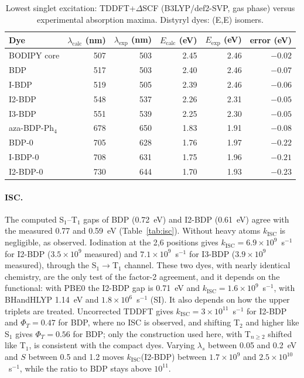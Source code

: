 \documentclass[journal=jctcce,manuscript=article,layout=twocolumn]{achemso}
\newcommand{\kisc}{k_\mathrm{ISC}}
\begin{document}
\begin{table}
  \caption{Lowest singlet excitation: TDDFT+$\Delta$SCF (B3LYP/def2-SVP, gas phase) versus
  experimental absorption maxima. Distyryl dyes: (E,E) isomers.}
  \label{tab:abs}
  \begin{tabular}{lrrrrr}
    \toprule
    Dye & $\lambda_\mathrm{calc}$ (nm) & $\lambda_\mathrm{exp}$ (nm) & $E_\mathrm{calc}$ (eV) &
    $E_\mathrm{exp}$ (eV) & error (eV) \\
    \midrule
    BODIPY core     & 507 & 503 & 2.45 & 2.46 & $-0.02$ \\
    BDP             & 517 & 503 & 2.40 & 2.46 & $-0.07$ \\
    I-BDP           & 519 & 505 & 2.39 & 2.46 & $-0.06$ \\
    I2-BDP          & 548 & 537 & 2.26 & 2.31 & $-0.05$ \\
    I3-BDP          & 551 & 539 & 2.25 & 2.30 & $-0.05$ \\
    aza-BDP-Ph$_4$  & 678 & 650 & 1.83 & 1.91 & $-0.08$ \\
    \midrule
    BDP-0           & 705 & 628 & 1.76 & 1.97 & $-0.22$ \\
    I-BDP-0         & 708 & 631 & 1.75 & 1.96 & $-0.21$ \\
    I2-BDP-0        & 730 & 644 & 1.70 & 1.93 & $-0.23$ \\
    \bottomrule
  \end{tabular}
\end{table}

\paragraph{ISC.} The computed S$_1$--T$_1$ gaps of BDP (0.72~eV) and I2-BDP (0.61~eV) agree with the
measured 0.77 and 0.59~eV (Table~\ref{tab:isc}). Without heavy atoms $\kisc$ is negligible, as observed.
Iodination at the 2,6 positions gives $\kisc=6.9\times10^{9}$~s$^{-1}$ for I2-BDP ($3.5\times10^{9}$
measured) and $7.1\times10^{9}$~s$^{-1}$ for I3-BDP ($3.9\times10^{9}$ measured), through the
S$_1\to$T$_1$ channel. These two dyes, with nearly identical chemistry, are the only test of the factor-2
agreement, and it depends on the functional: with PBE0 the I2-BDP gap is 0.71~eV and
$\kisc=1.6\times10^{9}$~s$^{-1}$, with BHandHLYP 1.14~eV and $1.8\times10^{6}$~s$^{-1}$ (SI). It also
depends on how the upper triplets are treated. Uncorrected TDDFT gives $\kisc=3\times10^{11}$~s$^{-1}$ for
I2-BDP and $\Phi_T=0.47$ for BDP, where no ISC is observed, and shifting T$_2$ and higher like S$_1$ gives
$\Phi_T=0.56$ for BDP; only the construction used here, with T$_{n\ge2}$ shifted like T$_1$, is consistent
with the compact dyes. Varying $\lambda_s$ between 0.05 and 0.2~eV and $S$ between 0.5 and 1.2 moves
$\kisc$(I2-BDP) between $1.7\times10^{9}$ and $2.5\times10^{10}$~s$^{-1}$, while the ratio to BDP stays
above $10^{11}$.
\end{document}
